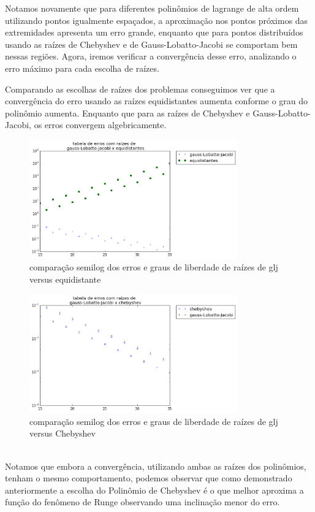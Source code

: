 Notamos novamente que para diferentes  polinômios de lagrange de alta ordem utilizando pontos igualmente espaçados, a aproximação nos pontos próximos das extremidades apresenta um erro  grande, enquanto que para pontos distribuídos usando as raízes de Chebyshev e de Gauss-Lobatto-Jacobi se comportam bem nessas regiões. Agora, iremos verificar a convergência desse erro, analizando o erro máximo para cada escolha de raízes.

Comparando as escolhas de raízes dos problemas conseguimos ver que a convergência do erro usando as raízes equidistantes aumenta conforme o grau do polinômio aumenta. Enquanto que para as raízes de Chebyshev e Gauss-Lobatto-Jacobi, os erros convergem algebricamente. 
\begin{figure}[!ht]
  \includegraphics[width=0.8\textwidth,center]{figuras/glj_equi.png}
  \caption{comparação semilog  dos erros e graus de liberdade de raízes de glj versus equidistante }
\end{figure}
\begin{figure}[!hb]
  \includegraphics[width=0.8\textwidth,center]{figuras/glj_cheb.png}
  \caption{comparação semilog  dos erros e graus de liberdade de raízes de glj versus Chebyshev}
\end{figure}
\\
Notamos que embora a convergência, utilizando ambas as raízes dos polinômios, tenham o mesmo comportamento, podemos observar que como demonstrado  anteriormente a escolha do Polinômio de Chebyshev é o que melhor aproxima a função do fenômeno de Runge observando uma inclinação menor do erro.

